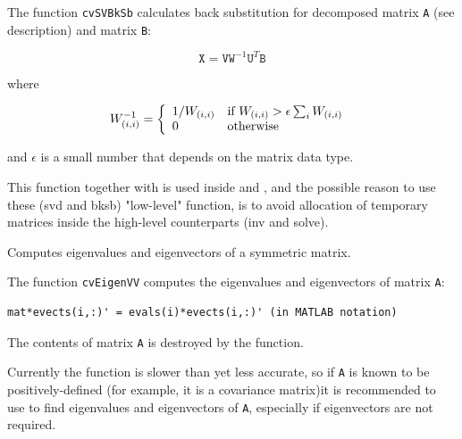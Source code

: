 The function \texttt{cvSVBkSb} calculates back substitution for decomposed matrix \texttt{A} (see  description) and matrix \texttt{B}:

\[
\texttt{X} = \texttt{V} \texttt{W}^{-1} \texttt{U}^T \texttt{B}
\]

where

\[
W^{-1}_{(i,i)}=
\left\{ \begin{array}{l l} 1/W_{(i,i)} & \mbox{if $W_{(i,i)} > \epsilon \sum_i{W_{(i,i)}}$ }\\ 0 & \mbox{otherwise}\\ \end{array} \right.
\]

and $\epsilon$ is a small number that depends on the matrix data type.

This function together with  is used inside 
and , and the possible reason to use these (svd and bksb)
"low-level" function, is to avoid allocation of temporary matrices inside
the high-level counterparts (inv and solve).

\label{EigenVV}

Computes eigenvalues and eigenvectors of a symmetric matrix.


\begin{description}
\end{description}


The function \texttt{cvEigenVV} computes the eigenvalues and eigenvectors of matrix \texttt{A}:

\begin{lstlisting}
mat*evects(i,:)' = evals(i)*evects(i,:)' (in MATLAB notation)
\end{lstlisting}

The contents of matrix \texttt{A} is destroyed by the function.

Currently the function is slower than  yet less accurate,
so if \texttt{A} is known to be positively-defined (for example, it
is a covariance matrix)it is recommended to use  to find
eigenvalues and eigenvectors of \texttt{A}, especially if eigenvectors
are not required.

